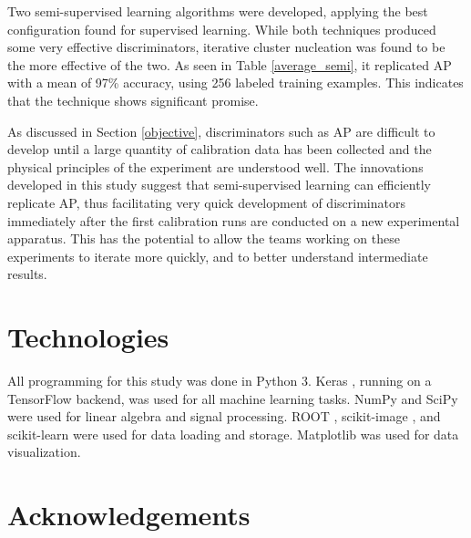 \documentclass[10pt]{article}
\begin{document}
Two semi-supervised learning algorithms were developed, applying the best configuration found for supervised learning. While both techniques produced some very effective discriminators, iterative cluster nucleation was found to be the more effective of the two. As seen in Table \ref{average_semi}, it replicated AP with a mean of 97\% accuracy, using 256 labeled training examples. This indicates that the technique shows significant promise.

As discussed in Section \ref{objective}, discriminators such as AP are difficult to develop until a large quantity of calibration data has been collected and the physical principles of the experiment are understood well. The innovations developed in this study suggest that semi-supervised learning can efficiently replicate AP, thus facilitating very quick development of discriminators immediately after the first calibration runs are conducted on a new experimental apparatus. This has the potential to allow the teams working on these experiments to iterate more quickly, and to better understand intermediate results.

\section{Technologies}

All programming for this study was done in Python 3. Keras \cite{keras}, running on a TensorFlow \cite{tensorflow} backend, was used for all machine learning tasks. NumPy \cite{numpy} and SciPy \cite{scipy} were used for linear algebra and signal processing. ROOT \cite{root}, scikit-image \cite{scikit-image}, and scikit-learn \cite{scikit-learn} were used for data loading and storage. Matplotlib \cite{matplotlib} was used for data visualization.

\section{Acknowledgements}
\end{document}

